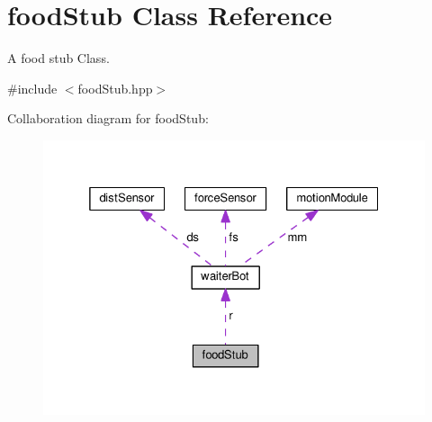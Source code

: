 \hypertarget{classfoodStub}{}\section{food\+Stub Class Reference}
\label{classfoodStub}


A food stub Class.  




{\ttfamily \#include $<$food\+Stub.\+hpp$>$}



Collaboration diagram for food\+Stub\+:
\nopagebreak
\begin{figure}[H]
\begin{center}
\leavevmode
\includegraphics[width=325pt]{classfoodStub__coll__graph}
\end{center}
\end{figure}
